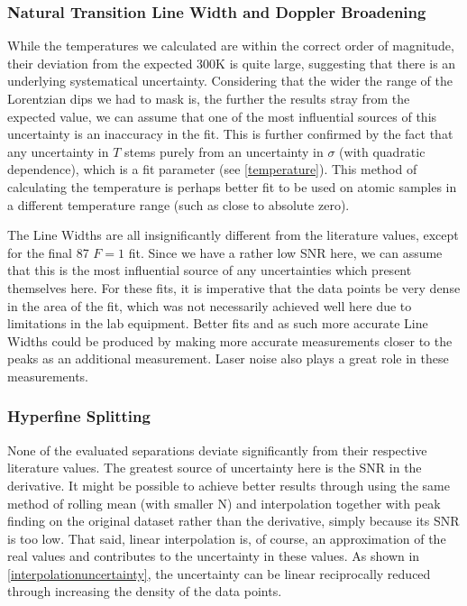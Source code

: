 \documentclass[12pt, a4paper]{article}
\begin{document}
\subsubsection{Natural Transition Line Width and Doppler Broadening}
While the temperatures we calculated are within the correct order of magnitude, their deviation from the expected $300\si{\kelvin}$ is quite large, suggesting that there is an underlying systematical uncertainty. Considering that the wider the range of the Lorentzian dips we had to mask is, the further the results stray from the expected value, we can assume that one of the most influential sources of this uncertainty is an inaccuracy in the fit. This is further confirmed by the fact that any uncertainty in $T$ stems purely from an uncertainty in $\sigma$ (with quadratic dependence), which is a fit parameter (see \autoref{temperature}). This method of calculating the temperature is perhaps better fit to be used on atomic samples in a different temperature range (such as close to absolute zero).

The Line Widths are all insignificantly different from the literature values, except for the final 87 $F = 1$ fit. Since we have a rather low SNR here, we can assume that this is the most influential source of any uncertainties which present themselves here. For these fits, it is imperative that the data points be very dense in the area of the fit, which was not necessarily achieved well here due to limitations in the lab equipment. Better fits and as such more accurate Line Widths could be produced by making more accurate measurements closer to the peaks as an additional measurement. Laser noise also plays a great role in these measurements.

\subsubsection{Hyperfine Splitting}
None of the evaluated separations deviate significantly from their respective literature values. The greatest source of uncertainty here is the SNR in the derivative. It might be possible to achieve better results through using the same method of rolling mean (with smaller N) and interpolation together with peak finding on the original dataset rather than the derivative, simply because its SNR is too low. That said, linear interpolation is, of course, an approximation of the real values and contributes to the uncertainty in these values. As shown in \autoref{interpolationuncertainty}, the uncertainty can be linear reciprocally reduced through increasing the density of the data points.
\end{document}
